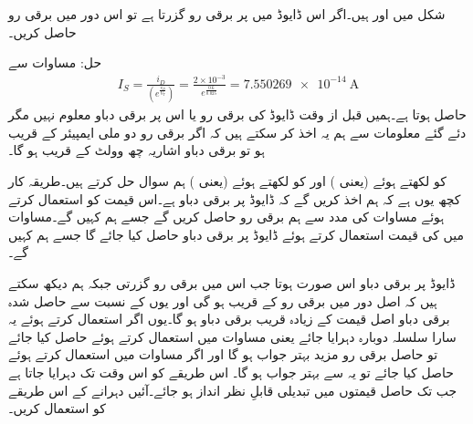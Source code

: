 شکل   میں  اور  ہیں۔اگر اس ڈایوڈ
 میں  پر  برقی رو گزرتا ہے تو اس دور میں برقی رو حاصل کریں۔ 

حل:	مساوات   سے
\begin{align*}
I_S = \frac{i_D}{\left( e^{\frac{v_D}{V_T}} \right )}=\frac{2 \times 10^{-3}}{e^{\frac{0.6}{0.025}}}=\SI{7.550269e-14}{\ampere}
\end{align*}
حاصل ہوتا ہے۔ہمیں قبل از وقت ڈایوڈ کی برقی رو یا اس پر برقی دباو معلوم نہیں مگر دئے گئے معلومات سے ہم یہ اخذ کر سکتے ہیں کہ اگر برقی رو دو ملی ایمپیئر کے قریب ہو تو برقی دباو اشاریہ چھ وولٹ کے قریب ہو گا۔

 کو  لکھتے ہوئے (یعنی ) اور
  کو   لکھتے ہوئے (یعنی ) ہم سوال حل کرتے ہیں۔طریقہ کار کچھ یوں ہے کہ ہم اخذ کریں گے کہ ڈایوڈ پر   برقی دباو ہے۔اس قیمت کو استعمال کرتے ہوئے مساوات   کی مدد سے ہم برقی رو حاصل کریں گے جسے ہم  کہیں گے۔مساوات   میں  کی قیمت استعمال کرتے ہوئے ڈایوڈ پر برقی دباو حاصل کیا جائے گا جسے ہم  کہیں گے۔

ڈایوڈ پر  برقی دباو اس صورت ہوتا جب اس میں  برقی رو گزرتی جبکہ ہم دیکھ سکتے ہیں کہ اصل دور میں برقی رو  کے قریب ہو گی اور یوں  کے نسبت سے حاصل شدہ برقی دباو  اصل قیمت کے زیادہ قریب برقی دباو ہو گا۔یوں اگر   استعمال کرتے ہوئے یہ سارا سلسلہ دوبارہ دہرایا جائے یعنی مساوات   میں   استعمال کرتے ہوئے  حاصل کیا جائے تو حاصل برقی رو مزید بہتر جواب ہو گا اور اگر مساوات   میں  استعمال کرتے ہوئے  حاصل کیا جائے تو یہ  سے بہتر جواب ہو گا۔ اس طریقے کو اس وقت تک  دہرایا جاتا ہے جب تک حاصل قیمتوں میں تبدیلی قابلِ نظر انداز ہو جائے۔آئیں دہرانے کے اس طریقے کو استعمال کریں۔
 
